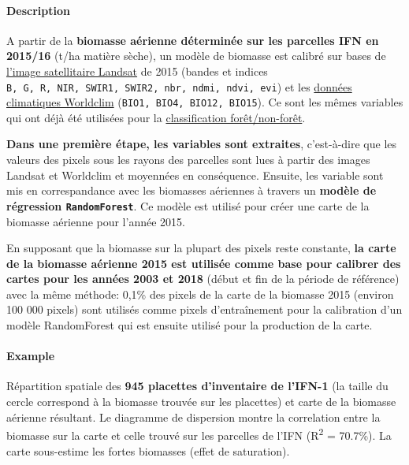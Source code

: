 \documentclass[a4paper, notitlepage, 12pt, krantz2]{krantz}
\let\oldparagraph\paragraph
\renewcommand{\paragraph}[1]{\oldparagraph{#1}\mbox{}}
\begin{document}
\hypertarget{description-1}{%
\paragraph{Description}\label{description-1}}

A partir de la \textbf{biomasse aérienne déterminée sur les parcelles IFN en 2015/16} (t/ha matière sèche), un modèle de biomasse est calibré sur bases de \protect\hyperlink{SSTS-Landsat}{l'image satellitaire Landsat} de 2015 (bandes et indices \texttt{B,\ G,\ R,\ NIR,\ SWIR1,\ SWIR2,\ nbr,\ ndmi,\ ndvi,\ evi}) et les \protect\hyperlink{SSTS-Worldclim}{données climatiques Worldclim} (\texttt{BIO1,\ BIO4,\ BIO12,\ BIO15}). Ce sont les mêmes variables qui ont déjà été utilisées pour la \protect\hyperlink{NRF-create-fc-maps}{classification forêt/non-forêt}.

\textbf{Dans une première étape, les variables sont extraites}, c'est-à-dire que les valeurs des pixels sous les rayons des parcelles sont lues à partir des images Landsat et Worldclim et moyennées en conséquence. Ensuite, les variable sont mis en correspandance avec les biomasses aériennes à travers un \textbf{modèle de régression \texttt{RandomForest}}. Ce modèle est utilisé pour créer une carte de la biomasse aérienne pour l'année 2015.

En supposant que la biomasse sur la plupart des pixels reste constante, \textbf{la carte de la biomasse aérienne 2015 est utilisée comme base pour calibrer des cartes pour les années 2003 et 2018} (début et fin de la période de référence) avec la même méthode: 0,1\% des pixels de la carte de la biomasse 2015 (environ 100 000 pixels) sont utilisés comme pixels d'entraînement pour la calibration d'un modèle RandomForest qui est ensuite utilisé pour la production de la carte.

\hypertarget{example-8}{%
\paragraph{Example}\label{example-8}}

Répartition spatiale des \textbf{945 placettes d'inventaire de l'IFN-1} (la taille du cercle correspond à la biomasse trouvée sur les placettes) et carte de la biomasse aérienne résultant. Le diagramme de dispersion montre la correlation entre la biomasse sur la carte et celle trouvé sur les parcelles de l'IFN (R\textsuperscript{2} = 70.7\%). La carte sous-estime les fortes biomasses (effet de saturation).
\end{document}
